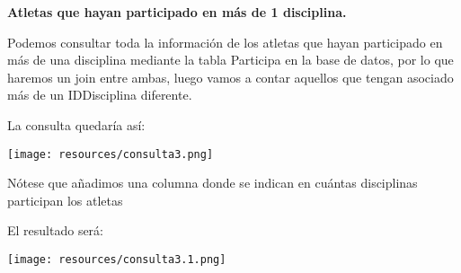 \textbf{Atletas que hayan participado en más de 1 disciplina.}\vspace{.3cm}

Podemos consultar toda la información de los atletas que hayan participado en más de una disciplina mediante la tabla Participa en la base de datos, por lo que haremos un join entre ambas, luego vamos a contar aquellos que tengan asociado más de un IDDisciplina diferente. 

La consulta quedaría así:
\begin{center}
    \texttt{[image: resources/consulta3.png]}
\end{center}
Nótese que añadimos una columna donde se indican en cuántas disciplinas participan los atletas

El resultado será:
\begin{center}
    \texttt{[image: resources/consulta3.1.png]}
\end{center}


